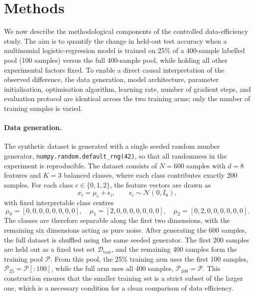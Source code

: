 \documentclass{article}
\begin{document}
\section{Methods}
\label{sec:methods}

We now describe the methodological components of the controlled data-efficiency study. The aim is to quantify the change in held-out test accuracy when a multinomial logistic-regression model is trained on 25\% of a 400-sample labelled pool (100 samples) versus the full 400-sample pool, while holding all other experimental factors fixed. To enable a direct causal interpretation of the observed difference, the data generation, model architecture, parameter initialisation, optimisation algorithm, learning rate, number of gradient steps, and evaluation protocol are identical across the two training arms; only the number of training samples is varied.

\paragraph{Data generation.}
The synthetic dataset is generated with a single seeded random number generator, \texttt{numpy.random.default\_rng(42)}, so that all randomness in the experiment is reproducible. The dataset consists of \(N=600\) samples with \(d=8\) features and \(K=3\) balanced classes, where each class contributes exactly 200 samples. For each class \(c \in \{0,1,2\}\), the feature vectors are drawn as
\begin{equation}
x_i = \mu_c + \epsilon_i, \qquad \epsilon_i \sim \mathcal{N}(0, I_8),
\end{equation}
with fixed interpretable class centres
\begin{equation}
\mu_0 = [0,0,0,0,0,0,0,0], \quad
\mu_1 = [2,0,0,0,0,0,0,0], \quad
\mu_2 = [0,2,0,0,0,0,0,0].
\end{equation}
The classes are therefore separable along the first two dimensions, with the remaining six dimensions acting as pure noise. After generating the 600 samples, the full dataset is shuffled using the same seeded generator. The first 200 samples are held out as a fixed test set \(\mathcal{D}_{\text{test}}\), and the remaining 400 samples form the training pool \(\mathcal{P}\). From this pool, the 25\% training arm uses the first 100 samples, \(\mathcal{P}_{25} = \mathcal{P}[:100]\), while the full arm uses all 400 samples, \(\mathcal{P}_{100} = \mathcal{P}\). This construction ensures that the smaller training set is a strict subset of the larger one, which is a necessary condition for a clean comparison of data efficiency.
\end{document}
